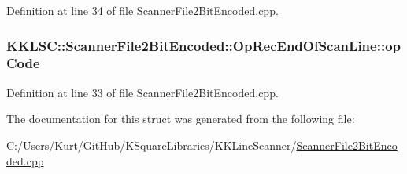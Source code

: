 Definition at line 34 of file Scanner\+File2\+Bit\+Encoded.\+cpp.

\subsubsection[{\texorpdfstring{op\+Code}{opCode}}]{ K\+K\+L\+S\+C\+::\+Scanner\+File2\+Bit\+Encoded\+::\+Op\+Rec\+End\+Of\+Scan\+Line\+::op\+Code}\hypertarget{struct_scanner_file2_bit_encoded_1_1_op_rec_end_of_scan_line_af6520848e4cad452f8292a689ddb867e}{}\label{struct_scanner_file2_bit_encoded_1_1_op_rec_end_of_scan_line_af6520848e4cad452f8292a689ddb867e}


Definition at line 33 of file Scanner\+File2\+Bit\+Encoded.\+cpp.



The documentation for this struct was generated from the following file\+:\begin{DoxyCompactItemize}
\item 
C\+:/\+Users/\+Kurt/\+Git\+Hub/\+K\+Square\+Libraries/\+K\+K\+Line\+Scanner/\hyperlink{_scanner_file2_bit_encoded_8cpp}{Scanner\+File2\+Bit\+Encoded.\+cpp}\end{DoxyCompactItemize}
